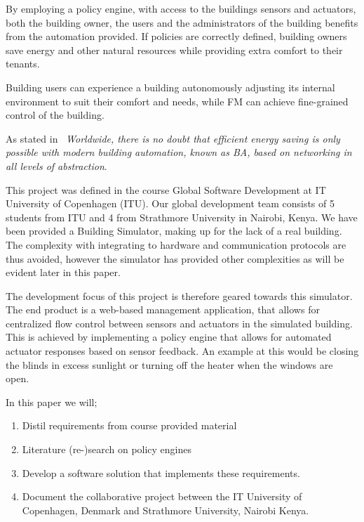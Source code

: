 
By employing a policy engine, with access to the buildings sensors and actuators, both the building owner, the users and the administrators of the building benefits from the automation provided. If policies are correctly defined, building owners save energy and other natural resources while providing extra comfort to their tenants. 

Building users can experience a building autonomously adjusting its internal environment to suit their comfort and needs, while FM can achieve fine-grained control of the building.

As stated in~\cite{ba-short} \textit{Worldwide, there is no doubt that efficient energy saving is only possible with modern building automation, known as BA, based on networking in all levels of abstraction}.

This project was defined in the course Global Software Development at IT University of Copenhagen (ITU). Our global development team consists of 5 students from ITU and 4 from Strathmore University in Nairobi, Kenya. We have been provided a Building Simulator, making up for the lack of a real building. The complexity with integrating to hardware and communication protocols are thus avoided, however the simulator has provided other complexities as will be evident later in this paper. 

The development focus of this project is therefore geared towards this simulator. The end product is a web-based management application, that allows for centralized flow control between sensors and actuators in the simulated building. This is achieved by implementing a policy engine that allows for automated actuator responses based on sensor feedback. An example at this would be closing the blinds in excess sunlight or turning off the heater when the windows are open.

In this paper we will; 
\begin{enumerate}
	\item Distil requirements from course provided material 
	\item Literature (re-)search on policy engines
	\item Develop a software solution that implements these requirements.
	\item Document the collaborative project between the IT University of Copenhagen, Denmark and Strathmore University, Nairobi Kenya.
\end{enumerate}

